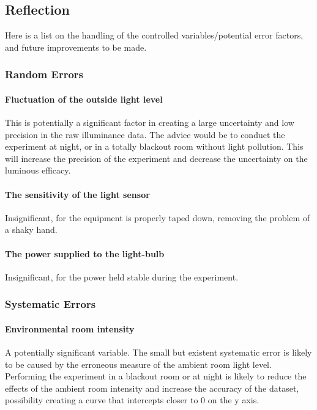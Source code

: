 \documentclass[a4paper,12pt]{article}
\begin{document}
\subsection{Reflection}

Here is a list on the handling of the controlled variables/potential error factors, and future improvements to be made.

\subsubsection{Random Errors}
\paragraph{Fluctuation of the outside light level} This is potentially a significant factor in creating a large uncertainty and low precision in the raw illuminance data. The advice would be to conduct the experiment at night, or in a totally blackout room without light pollution. This will increase the precision of the experiment and decrease the uncertainty on the luminous efficacy.

\paragraph{The sensitivity of the light sensor} Insignificant, for the equipment is properly taped down, removing the problem of a shaky hand.

\paragraph{The power supplied to the light-bulb}
Insignificant, for the power held stable during the experiment.

\subsubsection{Systematic Errors}
\paragraph{Environmental room intensity}
A potentially significant variable. The small but existent systematic error is likely to be caused by the erroneous measure of the ambient room light level. Performing the experiment in a blackout room or at night is likely to reduce the effects of the ambient room intensity and increase the accuracy of the dataset, possibility creating a curve that intercepts closer to 0 on the y axis.
\end{document}
